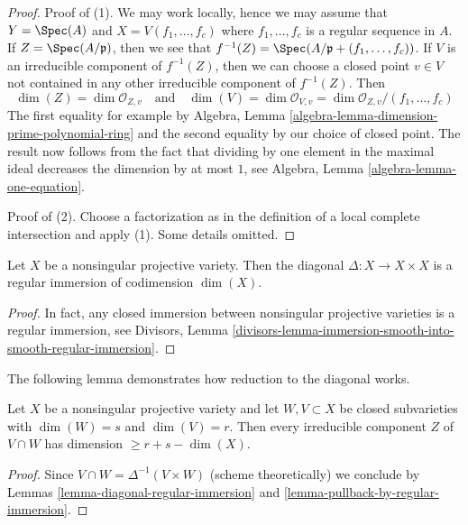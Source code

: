 \begin{proof}
Proof of (1). We may work locally, hence we may assume that
$Y = \Spec(A)$ and $X = V(f_1, \ldots, f_c)$ where $f_1, \ldots, f_c$
is a regular sequence in $A$. If $Z = \Spec(A/\mathfrak p)$, then
we see that $f^{-1}(Z) = \Spec(A/\mathfrak p + (f_1, \ldots, f_c))$.
If $V$ is an irreducible component of $f^{-1}(Z)$, then we can
choose a closed point $v \in V$ not contained in any other irreducible
component of $f^{-1}(Z)$. Then
$$
\dim(Z) = \dim \mathcal{O}_{Z, v}
\quad\text{and}\quad
\dim(V) = \dim \mathcal{O}_{V, v} = \dim \mathcal{O}_{Z, v}/(f_1, \ldots, f_c)
$$
The first equality for example by
Algebra, Lemma \ref{algebra-lemma-dimension-prime-polynomial-ring}
and the second equality by our choice of closed point.
The result now follows from the fact that dividing by one element
in the maximal ideal decreases the dimension by at most $1$, see
Algebra, Lemma \ref{algebra-lemma-one-equation}.

\medskip\noindent
Proof of (2). Choose a factorization as in the definition of a
local complete intersection and apply (1). Some details omitted.
\end{proof}

\begin{lemma}
\label{lemma-diagonal-regular-immersion}
Let $X$ be a nonsingular projective variety. Then the diagonal
$\Delta : X \to X \times X$ is a regular immersion of codimension $\dim(X)$.
\end{lemma}

\begin{proof}
In fact, any closed immersion between nonsingular projective
varieties is a regular immersion, see Divisors,
Lemma \ref{divisors-lemma-immersion-smooth-into-smooth-regular-immersion}.
\end{proof}

\noindent
The following lemma demonstrates how reduction to the diagonal works.

\begin{lemma}
\label{lemma-intersect-in-smooth}
Let $X$ be a nonsingular projective variety and let $W,V \subset X$
be closed subvarieties with $\dim(W) = s$ and $\dim(V) = r$. Then every
irreducible component $Z$ of $V \cap W$ has dimension $\geq r + s - \dim(X)$.
\end{lemma}

\begin{proof}
Since $V \cap W = \Delta^{-1}(V \times W)$ (scheme theoretically)
we conclude by Lemmas \ref{lemma-diagonal-regular-immersion} and
\ref{lemma-pullback-by-regular-immersion}.
\end{proof}

